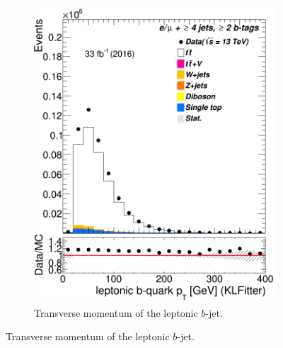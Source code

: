 \begin{figure}
\begin{subfigure}{0.35\textwidth}
		\includegraphics[width=\linewidth]{ControlPlots_emujets_2016_4incl_2incl/klf_blep_pt_emujets_2016.png}
		\caption{Transverse momentum of the leptonic $b$-jet.} \label{fig:klf7}
	\end{subfigure}
	

\end{figure}
